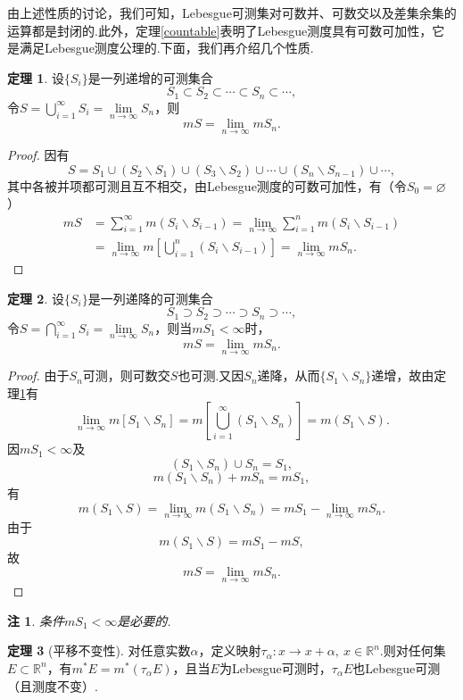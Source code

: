 \documentclass[lang=cn,12pt]{ctexart}
\theoremstyle{definition}
\newtheorem{theorem}{定理}
\theoremstyle{plain}
\newtheorem*{remark}{注}
\begin{document}
\hspace*{\fill}

由上述性质的讨论，我们可知，Lebesgue可测集对可数并、可数交以及差集余集的运算都是封闭的.此外，定理\ref{countable}表明了Lebesgue测度具有可数可加性，它是满足Lebesgue测度公理的.下面，我们再介绍几个性质.

\begin{theorem}\label{zeng}
	设$\{S_i\}$是一列递增的可测集合
	$$S_1\subset S_2\subset\cdots\subset S_n\subset\cdots,$$
	令$S=\bigcup\limits_{i=1}^{\infty}S_i=\lim\limits_{n\to\infty}S_n$，则
	$$mS=\lim\limits_{n\to\infty}mS_n.$$
\end{theorem}
\begin{proof}
	因有
	$$S=S_1\cup(S_2\backslash S_1)\cup(S_3\backslash S_2)\cup\cdots\cup(S_n\backslash S_{n-1})\cup\cdots,$$
	其中各被并项都可测且互不相交，由Lebesgue测度的可数可加性，有（令$S_0=\varnothing$）
	\begin{align*}
		mS&=\sum_{i=1}^{\infty}m(S_i\backslash S_{i-1})=\lim\limits_{n\to\infty}\sum_{i=1}^{n}m(S_i\backslash S_{i-1})\\
		&=\lim\limits_{n\to\infty}m\left[\bigcup_{i=1}^{n}(S_i\backslash S_{i-1})\right]=\lim\limits_{n\to\infty}mS_n.
	\end{align*}
	
\end{proof}
\begin{theorem}
	设$\{S_i\}$是一列递降的可测集合
	$$S_1\supset S_2\supset\cdots\supset S_n\supset\cdots,$$
	令$S=\bigcap\limits_{i=1}^{\infty}S_i=\lim\limits_{n\to\infty}S_n$，则当$mS_1<\infty$时，
	$$mS=\lim\limits_{n\to\infty}mS_n.$$
\end{theorem}
\begin{proof}
	由于$S_n$可测，则可数交$S$也可测.又因$S_n$递降，从而$\{S_1\backslash S_n\}$递增，故由定理\ref{zeng}有
	$$\lim\limits_{n\to\infty}m\left[S_1\backslash S_n\right]=m\left[\bigcup_{i=1}^{\infty}(S_1\backslash S_n)\right]=m(S_1\backslash S).$$
	因$mS_1<\infty$及
	$$(S_1\backslash S_n)\cup S_n=S_1,$$
	$$m(S_1\backslash S_n)+mS_n=mS_1,$$
	有
	$$m(S_1\backslash S)=\lim\limits_{n\to\infty}m(S_1\backslash S_n)=mS_1-\lim\limits_{n\to\infty}mS_n.$$
	由于
	$$m(S_1\backslash S)=mS_1-mS,$$
	故
	$$mS=\lim\limits_{n\to\infty}mS_n.$$
\end{proof}
\begin{remark}
	条件$mS_1<\infty$是必要的.
\end{remark}
\begin{theorem}[平移不变性]
	对任意实数$\alpha$，定义映射$\tau_\alpha:x\to x+\alpha,\ x\in\mathbb{R}^n$.则对任何集$E\subset\mathbb{R}^n$，有$m^*E=m^*(\tau_\alpha E)$，且当$E$为Lebesgue可测时，$\tau_\alpha E$也Lebesgue可测（且测度不变）.
\end{theorem}
\end{document}

